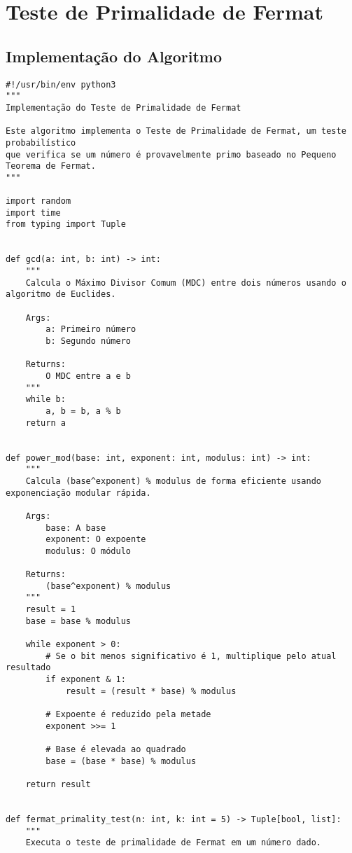 \section{Teste de Primalidade de Fermat}\label{apx:fermat-impl}

\subsection{Implementação do Algoritmo}

\begin{verbatim}
#!/usr/bin/env python3
"""
Implementação do Teste de Primalidade de Fermat

Este algoritmo implementa o Teste de Primalidade de Fermat, um teste probabilístico
que verifica se um número é provavelmente primo baseado no Pequeno Teorema de Fermat.
"""

import random
import time
from typing import Tuple


def gcd(a: int, b: int) -> int:
    """
    Calcula o Máximo Divisor Comum (MDC) entre dois números usando o algoritmo de Euclides.
    
    Args:
        a: Primeiro número
        b: Segundo número
        
    Returns:
        O MDC entre a e b
    """
    while b:
        a, b = b, a % b
    return a


def power_mod(base: int, exponent: int, modulus: int) -> int:
    """
    Calcula (base^exponent) % modulus de forma eficiente usando exponenciação modular rápida.
    
    Args:
        base: A base
        exponent: O expoente
        modulus: O módulo
        
    Returns:
        (base^exponent) % modulus
    """
    result = 1
    base = base % modulus
    
    while exponent > 0:
        # Se o bit menos significativo é 1, multiplique pelo atual resultado
        if exponent & 1:
            result = (result * base) % modulus
            
        # Expoente é reduzido pela metade
        exponent >>= 1
        
        # Base é elevada ao quadrado
        base = (base * base) % modulus
        
    return result


def fermat_primality_test(n: int, k: int = 5) -> Tuple[bool, list]:
    """
    Executa o teste de primalidade de Fermat em um número dado.
    

\end{verbatim}
